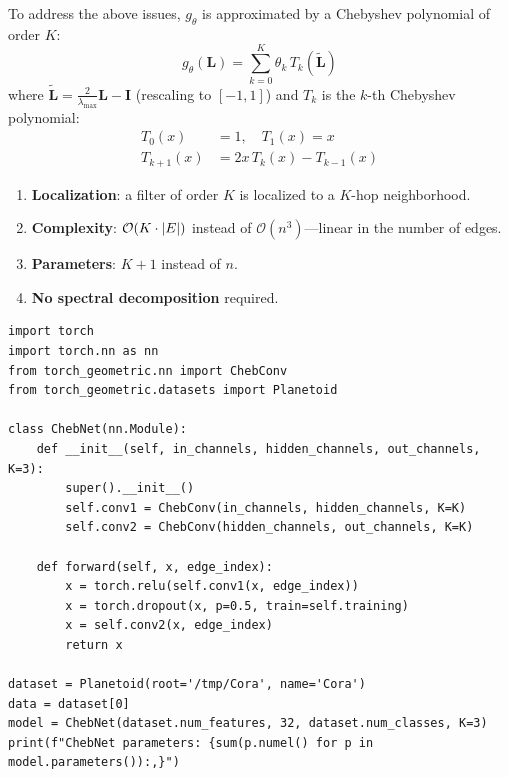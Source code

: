 \begin{definition}
To address the above issues, $g_\theta$ is approximated by a Chebyshev
polynomial of order $K$:
\[
    g_\theta(\mathbf{L}) = \sum_{k=0}^{K} \theta_k\, T_k(\tilde{\mathbf{L}})
\]
where $\tilde{\mathbf{L}} = \frac{2}{\lambda_{\max}}\mathbf{L} - \mathbf{I}$
(rescaling to $[-1, 1]$) and $T_k$ is the $k$-th Chebyshev polynomial:
\begin{align}
    T_0(x) &= 1, \quad T_1(x) = x \\
    T_{k+1}(x) &= 2x\, T_k(x) - T_{k-1}(x)
\end{align}
\end{definition}

\begin{theorem}
\begin{enumerate}
    \item \textbf{Localization}: a filter of order $K$ is localized to a
          $K$-hop neighborhood.
    \item \textbf{Complexity}: $\mathcal{O}(K \cdot \left| E \right|)$ instead of
          $\mathcal{O}(n^3)$---linear in the number of edges.
    \item \textbf{Parameters}: $K + 1$ instead of $n$.
    \item \textbf{No spectral decomposition} required.
\end{enumerate}
\end{theorem}

\begin{codeblock}[title=\textbf{ChebNet implementation}]
\begin{verbatim}
import torch
import torch.nn as nn
from torch_geometric.nn import ChebConv
from torch_geometric.datasets import Planetoid

class ChebNet(nn.Module):
    def __init__(self, in_channels, hidden_channels, out_channels, K=3):
        super().__init__()
        self.conv1 = ChebConv(in_channels, hidden_channels, K=K)
        self.conv2 = ChebConv(hidden_channels, out_channels, K=K)

    def forward(self, x, edge_index):
        x = torch.relu(self.conv1(x, edge_index))
        x = torch.dropout(x, p=0.5, train=self.training)
        x = self.conv2(x, edge_index)
        return x

dataset = Planetoid(root='/tmp/Cora', name='Cora')
data = dataset[0]
model = ChebNet(dataset.num_features, 32, dataset.num_classes, K=3)
print(f"ChebNet parameters: {sum(p.numel() for p in model.parameters()):,}")
\end{verbatim}
\end{codeblock}

